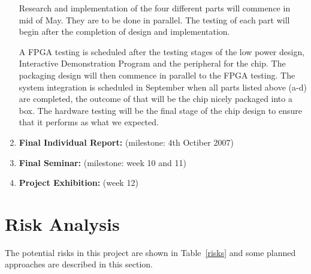 \documentclass[a4paper,12pt]{article}
\begin{document}
\begin{enumerate}
Research and implementation of the four different parts will commence
in mid of May. They are to be done in parallel. The testing of each
part will begin after the completion of design and implementation.

A FPGA testing is scheduled after the testing stages of the low power
design, Interactive Demonstration Program and the peripheral for the
chip. The packaging design will then commence in parallel to the FPGA
testing. The system integration is scheduled in September when all
parts listed above (a-d) are completed, the outcome of that will be
the chip nicely packaged into a box. The hardware testing will be the
final stage of the chip design to ensure that it performs as what we
expected.

\item \textbf{Final Individual Report:} (milestone: 4th Octiber 2007)

\item \textbf{Final Seminar:} (milestone: week 10 and 11)

\item \textbf{Project Exhibition:} (week 12)
\end{enumerate}

%

\section{Risk Analysis}

The potential risks in this project are shown in Table~\ref{risks} and
some planned approaches are described in this section.
\end{document}
